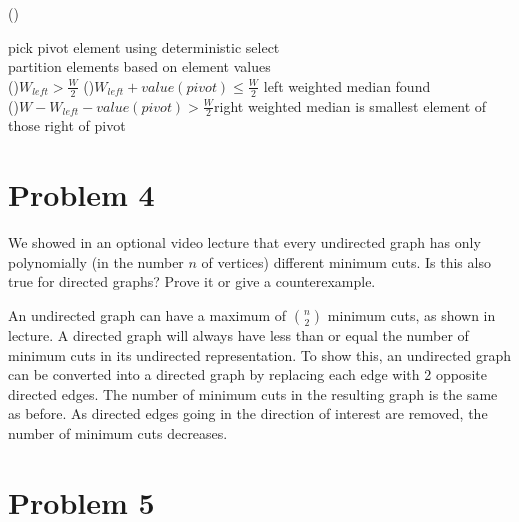 \documentclass[10pt]{article}
\begin{document}
\Fn(){}{
	\BlankLine
	
	{pick pivot element using deterministic select}\\
	{partition elements based on element values}\\
	\If(){$W_{left} > \frac{W}{2}$}{\;
	}
	\If(){$W_{left} + value(pivot) \leq \frac{W}{2}$}{\;
	}
	{left weighted median found}\\
	\If(){$W - W_{left} - value(pivot) > \frac{W}{2}$}{right weighted median is smallest element of those right of pivot\;
	}
}

\section*{\normalsize Problem 4}

We showed in an optional video lecture that every undirected graph has only polynomially (in the number $n$ of vertices) different minimum cuts. Is this also true for directed graphs? Prove it or give a counterexample.
\smallskip

An undirected graph can have a maximum of $\binom{n}{2}$ minimum cuts, as shown in lecture. A directed graph will always have less than or equal the number of minimum cuts in its undirected representation. To show this, an undirected graph can be converted into a directed graph by replacing each edge with 2 opposite directed edges. The number of minimum cuts in the resulting graph is the same as before. As directed edges going in the direction of interest are removed, the number of minimum cuts decreases.

\section*{\normalsize Problem 5}
\end{document}

